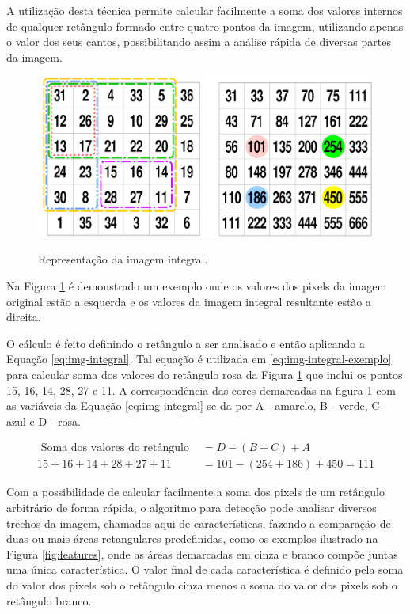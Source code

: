 A utilização desta técnica permite calcular facilmente a soma dos valores internos de qualquer retângulo formado entre quatro pontos da imagem, utilizando apenas o valor dos seus cantos, possibilitando assim a análise rápida de diversas partes da imagem.

\begin{figure}[htb]
    \centering
    \caption{Representação da imagem integral.}
    \includegraphics[scale=.3]{figs/imagem-integral.png}
    \label{fig:integral}
\end{figure}

Na Figura \ref{fig:integral} é demonstrado um exemplo onde os valores dos pixels da imagem original estão a esquerda e os valores da imagem integral resultante estão a direita.

O cálculo é feito definindo o retângulo a ser analisado e então aplicando a Equação \eqref{eq:img-integral}. Tal equação é utilizada em \eqref{eq:img-integral-exemplo} para calcular soma dos valores do retângulo rosa da Figura \ref{fig:integral} que inclui os pontos 15, 16, 14, 28, 27 e 11. A correspondência das cores demarcadas na figura \ref{fig:integral} com as variáveis da Equação \eqref{eq:img-integral} se da por A - amarelo, B - verde, C - azul e D - rosa.

\begin{align}\label{eq:img-integral}
    \text{ Soma dos valores do retângulo } & = D - (B + C) + A               \\
    \label{eq:img-integral-exemplo}
    15 + 16 + 14 + 28 + 27 + 11            & = 101 - (254 + 186) + 450 = 111
\end{align}

Com a possibilidade de calcular facilmente a soma dos pixels de um retângulo arbitrário de forma rápida, o algoritmo para detecção pode analisar diversos trechos da imagem, chamados aqui de características, fazendo a comparação de duas ou mais áreas retangulares predefinidas, como os exemplos ilustrado na Figura \ref{fig:features}, onde as áreas demarcadas em cinza e branco compõe juntas uma única característica. O valor final de cada característica é definido pela soma do valor dos pixels sob o retângulo cinza menos a soma do valor dos pixels sob o retângulo branco.


